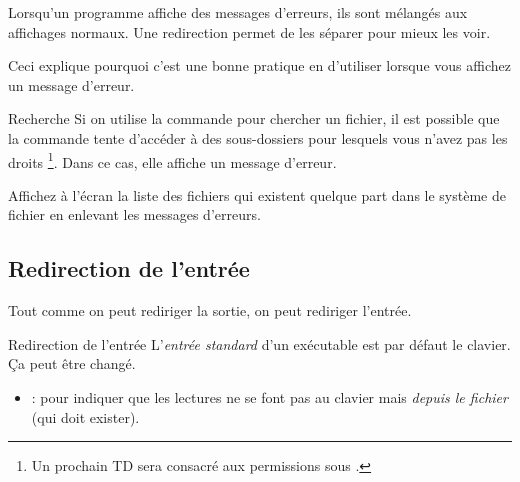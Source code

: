 \documentclass[a4paper,11pt]{style-esi/td}
\begin{document}
		Lorsqu'un programme affiche des messages d'erreurs,
		ils sont mélangés aux affichages normaux.
		Une redirection permet de les séparer pour mieux les voir.

		Ceci explique pourquoi c'est une bonne pratique en 
		d'utiliser  lorsque vous affichez un message d'erreur.

		\begin{Exercice}{Recherche}
			Si on utilise la commande  pour chercher un fichier,
			il est possible que la commande tente d'accéder à des sous-dossiers
			pour lesquels vous n'avez pas les droits%
			\footnote{%
				Un prochain TD sera consacré aux permissions sous .
			}.
			Dans ce cas, elle affiche un message d'erreur.

			Affichez à l'écran la liste des fichiers 
			qui existent quelque part dans le système de fichier
			en enlevant les messages d'erreurs.
		\end{Exercice}

	\subsection{Redirection de l'entrée}

		Tout comme on peut rediriger la sortie,
		on peut rediriger l'entrée.

		\begin{theorie}{Redirection de l'entrée}
			L'\emph{entrée standard} d'un exécutable est par défaut le clavier.
			\c Ca peut être changé. 
			\begin{itemize}
			\item {} : 
				pour indiquer que les lectures ne se font pas au clavier
				mais \emph{depuis le fichier} (qui doit exister).
			\end{itemize}
		\end{theorie}
\end{document}

